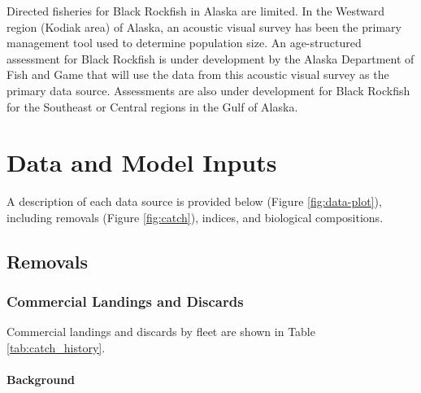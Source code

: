 \documentclass[11pt,
  letterpaper,
]{article}
\begin{document}
Directed fisheries for Black Rockfish in Alaska are limited. In the Westward region (Kodiak area) of Alaska, an acoustic visual survey has been the primary management tool used to determine population size. An age-structured assessment for Black Rockfish is under development by the Alaska Department of Fish and Game that will use the data from this acoustic visual survey as the primary data source. Assessments are also under development for Black Rockfish for the Southeast or Central regions in the Gulf of Alaska.

\hypertarget{data-and-model-inputs}{%
\section{Data and Model Inputs}\label{data-and-model-inputs}}

A description of each data source is provided below (Figure \ref{fig:data-plot}), including removals (Figure \ref{fig:catch}), indices, and biological compositions.

\hypertarget{removals-1}{%
\subsection{Removals}\label{removals-1}}

\hypertarget{commercial-landings-and-discards}{%
\subsubsection{Commercial Landings and Discards}\label{commercial-landings-and-discards}}

Commercial landings and discards by fleet are shown in Table \ref{tab:catch_history}.

\hypertarget{background}{%
\paragraph{Background}\label{background}}
\end{document}
